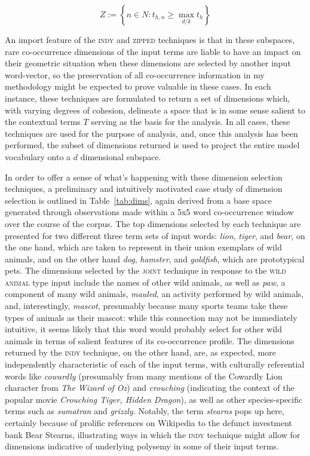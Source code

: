 \begin{equation}
Z := \left \{n \in N: t_{h,n} \geq \max_{d/k} t_h \right \}
\end{equation}

\noindent An import feature of the \textsc{indy} and \textsc{zipped} techniques is that in these subspaces, rare co-occurrence dimensions of the input terms are liable to have an impact on their geometric situation when these dimensions are selected by another input word-vector, so the preservation of all co-occurrence information in my methodology might be expected to prove valuable in these cases.  In each instance, these techniques are formulated to return a set of dimensions which, with varying degrees of cohesion, delineate a space that is in some sense salient to the contextual terms $T$ serving as the basis for the analysis.  In all cases, these techniques are used for the purpose of analysis, and, once this analysis has been performed, the subset of dimensions returned is used to project the entire model vocabulary onto a $d$ dimensional subspace.

In order to offer a sense of what's happening with these dimension selection techniques, a preliminary and intuitively motivated case study of dimension selection is outlined in Table~\ref{tab:dims}, again derived from a base space generated through observations made within a 5x5 word co-occurrence window over the course of the corpus.  The top dimensions selected by each technique are presented for two different three term sets of input words: \emph{lion}, \emph{tiger}, and \emph{bear}, on the one hand, which are taken to represent in their union exemplars of wild animals, and on the other hand \emph{dog}, \emph{hamster}, and \emph{goldfish}, which are prototypical pets.  The dimensions selected by the \textsc{joint} technique in response to the \textsc{wild animal} type input include the names of other wild animals, as well as \emph{paw}, a component of many wild animals, \emph{mauled}, an activity performed by wild animals, and, interestingly, \emph{mascot}, presumably because many sports teams take these types of animals as their mascot: while this connection may not be immediately intuitive, it seems likely that this word would probably select for other wild animals in terms of salient features of its co-occurrence profile.  The dimensions returned by the \textsc{indy} technique, on the other hand, are, as expected, more independently characteristic of each of the input terms, with culturally referential words like \emph{cowardly} (presumably from many mentions of the Cowardly Lion character from \emph{The Wizard of Oz}) and \emph{crouching} (indicating the context of the popular movie \emph{Crouching Tiger, Hidden Dragon}), as well as other species-specific terms such as \emph{sumatran} and \emph{grizzly}.  Notably, the term \emph{stearns} pops up here, certainly because of prolific references on Wikipedia to the defunct investment bank Bear Stearns, illustrating ways in which the \textsc{indy} technique might allow for dimensions indicative of underlying polysemy in some of their input terms.


